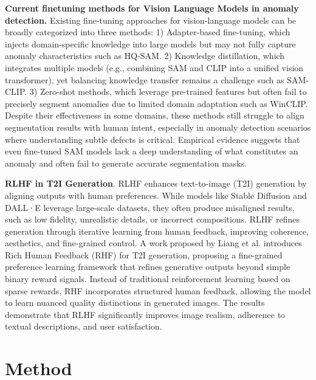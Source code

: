\documentclass[11pt]{article}
\begin{document}
\textbf{Current finetuning methods for Vision Language Models in anomaly detection.} Existing fine-tuning approaches for vision-language models can be broadly categorized into three methods: 1) Adapter-based fine-tuning, which injects domain-specific knowledge into large models but may not fully capture anomaly characteristics such as HQ-SAM\cite{ke2023segmenthighquality}. 2) Knowledge distillation, which integrates multiple models (e.g., combining SAM and CLIP into a unified vision transformer), yet balancing knowledge transfer remains a challenge such as SAM-CLIP\cite{wang2024samclipmergingvisionfoundation}. 3) Zero-shot methods, which leverage pre-trained features but often fail to precisely segment anomalies due to limited domain adaptation such as WinCLIP\cite{jeong2023winclipzerofewshotanomalyclassification}. Despite their effectiveness in some domains, these methods still struggle to align segmentation results with human intent, especially in anomaly detection scenarios where understanding subtle defects is critical. Empirical evidence suggests that even fine-tuned SAM models lack a deep understanding of what constitutes an anomaly and often fail to generate accurate segmentation masks.

\textbf{RLHF in T2I Generation}. RLHF enhances text-to-image (T2I) generation by aligning outputs with human preferences. While models like Stable Diffusion and DALL·E leverage large-scale datasets, they often produce misaligned results, such as low fidelity, unrealistic details, or incorrect compositions. RLHF refines generation through iterative learning from human feedback, improving coherence, aesthetics, and fine-grained control.
A work proposed by Liang et al.\cite{liang2024richhumanfeedbacktexttoimage} introduces Rich Human Feedback (RHF) for T2I generation, proposing a fine-grained preference learning framework that refines generative outputs beyond simple binary reward signals. Instead of traditional reinforcement learning based on sparse rewards, RHF incorporates structured human feedback, allowing the model to learn nuanced quality distinctions in generated images. The results demonstrate that RLHF significantly improves image realism, adherence to textual descriptions, and user satisfaction.


\section{Method}

\end{document}
